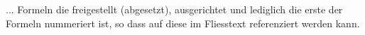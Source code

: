 
... Formeln die freigestellt (abgesetzt), ausgerichtet und  lediglich die erste der Formeln nummeriert ist, so dass auf diese  im Fliesstext referenziert werden kann.
